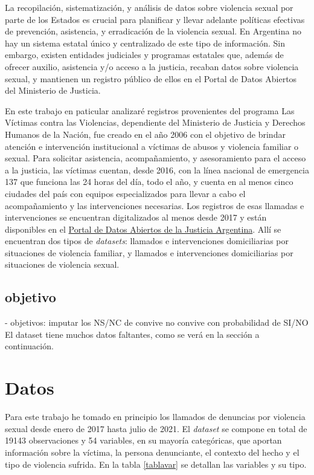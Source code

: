\documentclass[10 pt]{article}
\begin{document}
La  recopilación, sistematización, y análisis de datos sobre violencia sexual por parte de los Estados es crucial para planificar y llevar adelante políticas efectivas de prevención, asistencia, y erradicación de la violencia sexual. En Argentina no hay un sistema estatal único y centralizado de este tipo de información. Sin embargo, existen entidades judiciales y programas estatales que, además de ofrecer auxilio, asistencia y/o acceso a la justicia, recaban datos sobre violencia sexual, y mantienen un registro público de ellos en el Portal de Datos Abiertos del Ministerio de Justicia. 

En este trabajo en paticular analizaré registros provenientes del programa Las Víctimas contra las Violencias, dependiente del Ministerio de Justicia y Derechos Humanos de la Nación, fue creado en el año 2006 con el objetivo de brindar atención e intervención institucional a víctimas de abusos y violencia familiar o sexual. Para solicitar asistencia, acompañamiento, y asesoramiento para el acceso a la justicia, las víctimas cuentan, desde 2016, con la línea nacional de emergencia 137 que funciona las 24 horas del día, todo el año, y cuenta en al menos cinco ciudades del país con equipos especializados para llevar a cabo el acompañamiento y las intervenciones necesarias. Los registros de esas llamadas e intervenciones se encuentran digitalizados al menos desde 2017 y están disponibles en el \href{http://datos.jus.gob.ar/}{Portal de Datos Abiertos de la Justicia Argentina}. Allí se encuentran dos tipos de \textit{datasets}: llamados e intervenciones domiciliarias por situaciones de violencia familiar, y llamados e intervenciones domiciliarias por situaciones de violencia sexual. 



\subsection*{objetivo}
- objetivos: imputar los NS/NC de convive no convive con probabilidad de SI/NO 
El dataset tiene muchos datos faltantes, como se verá en la sección  a continuación.


\section*{Datos}\label{datos}

Para este trabajo he tomado en principio los llamados de denuncias por violencia sexual desde enero de 2017 hasta julio de 2021. El \textit{dataset} se compone en total de 19143 observaciones y 54 variables, en su mayoría categóricas, que aportan información sobre la víctima, la persona denunciante, el contexto del hecho y el tipo de violencia sufrida. En la tabla \ref{tablavar} se detallan las variables y su tipo.
\end{document}
